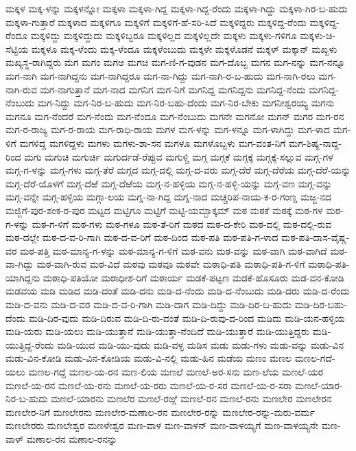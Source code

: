 ಮಕ್ಕಳ
ಮಕ್ಕ-ಳನ್ನು
ಮಕ್ಕಳನ್ನೋ
ಮಕ್ಕಳಾ
ಮಕ್ಕಳಾ-ಗಿದ್ದ
ಮಕ್ಕಳಾ-ಗಿದ್ದ-ರೆಂದು
ಮಕ್ಕಳಾ-ಗಿದ್ದು
ಮಕ್ಕಳಾ-ಗಿರ-ಬ-ಹುದು
ಮಕ್ಕಳಾ-ಗುತ್ತಾರೆ
ಮಕ್ಕಳಾದ
ಮಕ್ಕಳಿಗೂ
ಮಕ್ಕಳಿಗೆ
ಮಕ್ಕಳಿಗೆ-ಹೆ-ಸರಿ-ಸಿದೆ
ಮಕ್ಕಳಿದ್ದರು
ಮಕ್ಕಳಿದ್ದ-ರೆಂದು
ಮಕ್ಕಳಿದ್ದ-ರೆಂದೂ
ಮಕ್ಕಳಿದ್ದು
ಮಕ್ಕಳಿದ್ದುದು
ಮಕ್ಕಳಿಬ್ಬರೂ
ಮಕ್ಕಳಿಲ್ಲದ
ಮಕ್ಕಳಿಲ್ಲದೇ
ಮಕ್ಕಳು
ಮಕ್ಕಳು-ಗಳಿಗೂ
ಮಕ್ಕಳು-ಚಿ-ಸೆಟ್ಟಿಯ
ಮಕ್ಕಳೂ
ಮಕ್ಕ-ಳೆಂದು
ಮಕ್ಕ-ಳೆಂದೂ
ಮಕ್ಕಳೆಂಬುದು
ಮಕ್ಕಳೇ
ಮಕ್ಕಳೊಡನೆ
ಮಕ್ಕಳ್
ಮಕ್ಕಾನ್
ಮಖ್ಖಳು
ಮಖ್ಯಸ್ಥ-ರಾಗಿದ್ದರು
ಮಗ
ಮಗಂ
ಮಗಅ
ಮಗಚಿ
ಮಗ-ಣಿ-ಗ-ವುಡನ
ಮಗ-ದೊಬ್ಬ
ಮಗನ
ಮಗ-ನನ್ನು
ಮಗ-ನನ್ನೂ
ಮಗ-ನಾಗಿ
ಮಗ-ನಾಗಿದ್ದನು
ಮಗ-ನಾಗಿದ್ದರೂ
ಮಗ-ನಾ-ಗಿದ್ದು
ಮಗ-ನಾಗಿ-ರ-ಬ-ಹುದು
ಮಗ-ನಾಗಿ-ರಲು
ಮಗ-ನಾಗಿ-ರುವ
ಮಗ-ನಾಗುತ್ತಾನೆ
ಮಗ-ನಾದ
ಮಗನಿಗ
ಮಗ-ನಿಗೆ
ಮಗನಿದ್ದ
ಮಗನಿದ್ದನು
ಮಗನಿದ್ದ-ನೆಂದು
ಮಗನಿದ್ದ-ನೆಂಬುದು
ಮಗ-ನಿದ್ದು
ಮಗ-ನಿರ-ಬ-ಹುದು
ಮಗ-ನಿರ-ಬಹು-ದೆಂದು
ಮಗ-ನಿರ-ಬೇಕು
ಮಗನೀಶ್ವರಯ್ಯ
ಮಗನು
ಮಗನೂ
ಮಗ-ನೆಂದರೆ
ಮಗ-ನೆಂದು
ಮಗ-ನೆಂದೂ
ಮಗ-ನೆಂಬುದು
ಮಗನೇ
ಮಗನೋ
ಮಗನ್
ಮಗರ
ಮಗ-ರನ
ಮಗ-ರ-ರಾಜ್ಯ
ಮಗ-ರ-ರಾಯ
ಮಗ-ರಾಧಿ-ರಾಯ
ಮಗಳ
ಮಗ-ಳನ್ನು
ಮಗ-ಳನ್ನೂ
ಮಗ-ಳಾಗಿದ್ದು
ಮಗ-ಳಾದ
ಮಗ-ಳಿಗೆ
ಮಗಳಿದ್ದ
ಮಗಳಿದ್ದಳು
ಮಗಳು
ಮಗಳು-ಶಾ-ಸನ
ಮಗಳೂ
ಮಗಳೊಬ್ಬಳು
ಮಗ-ವಂತ-ನಿಗೆ
ಮಗ-ಶಿಷ್ಯ-ನಾದ್ದ-ರಿಂದ
ಮಗು
ಮಗುಚಿ
ಮಗುರ್ಚಿ
ಮಗುರ್ದಡೆ-ರೆಪ್ಪುವ
ಮಗುಳ್ಚಿ
ಮಗ್ಗ
ಮಗ್ಗಕೆ
ಮಗ್ಗಕ್ಕೆ
ಮಗ್ಗಕ್ಕೆ-ಸಲ್ಲುವ
ಮಗ್ಗ-ಗಳ
ಮಗ್ಗ-ಗ-ಳನ್ನು
ಮಗ್ಗ-ಗಳು
ಮಗ್ಗ-ತೆರೆ
ಮಗ್ಗದ
ಮಗ್ಗ-ದಲ್ಲಿ
ಮಗ್ಗ-ದ-ವರು
ಮಗ್ಗ-ದೆರೆ
ಮಗ್ಗ-ದೆರೆಯ
ಮಗ್ಗ-ದೆರೆ-ಯನ್ನು
ಮಗ್ಗ-ದೆರೆ-ಯೊಳಗೆ
ಮಗ್ಗ-ದೆಱೆ
ಮಗ್ಗ-ದೆಱೆಯ
ಮಗ್ಗ-ನ-ಹಳ್ಳಿಯ
ಮಗ್ಗ-ನ-ಹಳ್ಳಿ-ಯನ್ನು
ಮಗ್ಗ-ವಣ
ಮಗ್ಗ-ವನ್ನು
ಮಗ್ಗ-ವನ್ನೇ
ಮಗ್ಗ-ಹಳ್ಳಿಯ
ಮಗ್ಗಾ-ಲಯ
ಮಗ್ನ-ನಾ-ಗಿದ್ದ
ಮಗ್ನ-ನಾದ
ಮಚ್ಚರಿಪ-ನಾಯ-ಕ-ರ-ಗಂಣ್ಡ
ಮಜ್ಜ-ನದ
ಮಜ್ಜಿಗೆ-ಪುರ-ಶಂಕ-ರ-ಪುರ
ಮಟ್ಟದ
ಮಟ್ಟಿಗೂ
ಮಟ್ಟಿಗೆ
ಮಟ್ಟಿ-ಯಮ್ಬಾಕ್ಕಮ್
ಮಠ
ಮಠಕೆ
ಮಠಕ್ಕೆ
ಮಠ-ಗಳ
ಮಠ-ಗ-ಳನ್ನು
ಮಠ-ಗ-ಳಿಗೆ
ಮಠ-ಗಳು
ಮಠ-ಗಳೂ
ಮಠ-ತೆ-ರಿಗೆ
ಮಠದ
ಮಠ-ದ-ಕೇರಿ
ಮಠ-ದಲ್ಲಿ
ಮಠ-ದಲ್ಲಿ-ರುವ
ಮಠ-ದಲ್ಲೇ
ಮಠ-ದ-ವ-ರಿ-ಗಾಗಿ
ಮಠ-ದ-ವ-ರಿಗೆ
ಮಠ-ದಿಂದ
ಮಠ-ಪತಿ
ಮಠ-ಪತಿ-ಗ-ಳಾದ
ಮಠ-ಪತಿ-ದಾಸ-ವೈಷ್ಣ-ವರ
ಮಠ-ಪತ್ತಿ
ಮಠ-ಮಾನ್ಯ-ಗ-ಳನ್ನು
ಮಠ-ಮಾನ್ಯ-ಗ-ಳಿಗೆ
ಮಠ-ವನು
ಮಠ-ವನ್ನು
ಮಠ-ವಾಗಿ
ಮಠ-ವಾಗಿದೆ
ಮಠ-ವಾ-ಗಿದ್ದು
ಮಠ-ವಾಗಿ-ರುವ
ಮಠ-ವಿದೆ
ಮಠವು
ಮಠವೂ
ಮಠವೇ
ಮಠಾಧಿ-ಪತಿ
ಮಠಾಧಿ-ಪತಿ-ಗ-ಳಿಗೆ
ಮಠಾಧಿ-ಪತಿ-ಯಾಗಿದ್ದನು
ಮಠಾಧಿ-ಪತಿಯೋ
ಮಠಾಧೀಶ-ರಿಗೆ
ಮಠಾರ್ಯ
ಮಡಕೆ-ಪಟ್ಟಣ
ಮಡಕೆ-ಹೊಸೂರು
ಮಡ-ವನ-ಕೋಡಿ
ಮಡವಯ
ಮಡಿ
ಮಡಿದ
ಮಡಿ-ದಂತೆ
ಮಡಿ-ದನು
ಮಡಿ-ದ-ನೆಂದು
ಮಡಿ-ದ-ನೆಂಬುದು
ಮಡಿ-ದರು
ಮಡಿ-ದ-ರೆಂದು
ಮಡಿ-ದ-ವನು
ಮಡಿ-ದ-ವರ
ಮಡಿ-ದ-ವ-ರಿ-ಗಾಗಿ
ಮಡಿ-ದಾಗ
ಮಡಿ-ದಿದ್ದು
ಮಡಿ-ದಿರ-ಬ-ಹುದು
ಮಡಿ-ದಿರ-ಬಹು-ದೆಂದು
ಮಡಿ-ದಿರ-ವುದು
ಮಡಿ-ದಿರುವ
ಮಡಿ-ದಿ-ರು-ವಂತೆ
ಮಡಿ-ದಿ-ರುವು-ದ-ರಿಂದ
ಮಡಿದು
ಮಡಿ-ಯನ-ಹಳ್ಳಿಯ
ಮಡಿ-ಯರು
ಮಡಿ-ಯಲು
ಮಡಿ-ಯುತ್ತಾನೆ
ಮಡಿ-ಯುತ್ತಾ-ನೆಂದಿದೆ
ಮಡಿ-ಯುತ್ತಾರೆ
ಮಡಿ-ಯುತ್ತಿದ್ದರು
ಮಡಿ-ಯುತ್ತಿದ್ದ-ರೆಂದು
ಮಡಿ-ಯುವ
ಮಡಿ-ಯು-ವುದು
ಮಡಿ-ವಳ್ಳ
ಮಡಿಸ
ಮಡು
ಮಡು-ಗಳು
ಮಡು-ವನ್ನು
ಮಡು-ವಿನ
ಮಡು-ವಿನ-ಕೋಡಿ
ಮಡು-ವಿನ-ಕೋಡಿಯ
ಮಡು-ವಿ-ನಲ್ಲಿ
ಮಡು-ಹಿನ
ಮಡೆಯ
ಮಣಂ
ಮಣಲ
ಮಣಲ-ಗದೆ-ಯಲು
ಮಣಲ-ಗದ್ದೆ
ಮಣಲ-ಯ-ರನ
ಮಣ-ಲಿಯ
ಮಣಲೆ
ಮಣಲೆ-ಅರ-ಸನು
ಮಣ-ಲೆಯ
ಮಣಲೆ-ಯರ
ಮಣಲೆ-ಯ-ರನ
ಮಣಲೆ-ಯ-ರನು
ಮಣಲೆ-ಯ-ರರು
ಮಣಲೆ-ಯ-ರ-ಸರ
ಮಣಲೆ-ಯ-ರ-ಸರಾ
ಮಣಲೆ-ಯಾರ-ನಿರ-ಬ-ಹುದು
ಮಣಲೆ-ಯಾರನು
ಮಣಲೆರ
ಮಣಲೆ-ರಙ್ಗೆ
ಮಣಲೆ-ರನ
ಮಣಲೆ-ರನು
ಮಣಲೇರ
ಮಣಲೇರನ
ಮಣಲೇರ-ನಿಗೆ
ಮಣಲೇರನು
ಮಣಲೇರ-ಮಣಾಲ-ರನ
ಮಣಲೇರ-ರನ್ನು
ಮಣಲೇರ-ರನ್ನು-ಮರು-ವರ್ಮ
ಮಣಲೇರರು
ಮಣಲೇಶ್ವರ
ಮಣಳೇಶ್ವರ
ಮಣ-ವಾಳ
ಮಣ-ವಾಳನ್
ಮಣ-ವಾಳಯ್ಯಗೆ
ಮಣ-ವಾಳಯ್ಯನೇ
ಮಣ-ವಾಳ್
ಮಣಾಲ-ರನ
ಮಣಾಲ-ರನನ್ನು
